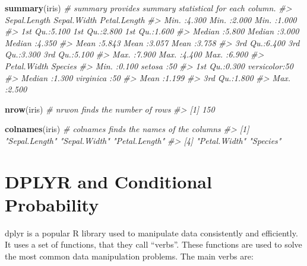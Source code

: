 \documentclass[
]{book}
\newenvironment{Shaded}{\begin{snugshade}}{\end{snugshade}}
\newcommand{\CommentTok}[1]{\textcolor[rgb]{0.56,0.35,0.01}{\textit{#1}}}
\newcommand{\FunctionTok}[1]{\textcolor[rgb]{0.13,0.29,0.53}{\textbf{#1}}}
\newcommand{\NormalTok}[1]{#1}
\theoremstyle{definition}
\theoremstyle{definition}
\theoremstyle{definition}
\theoremstyle{definition}
\theoremstyle{remark}
\begin{document}
\begin{Shaded}
\begin{Highlighting}[]
\FunctionTok{summary}\NormalTok{(iris) }\CommentTok{\# summary provides summary statistical for each column.}
\CommentTok{\#\textgreater{}   Sepal.Length    Sepal.Width     Petal.Length  }
\CommentTok{\#\textgreater{}  Min.   :4.300   Min.   :2.000   Min.   :1.000  }
\CommentTok{\#\textgreater{}  1st Qu.:5.100   1st Qu.:2.800   1st Qu.:1.600  }
\CommentTok{\#\textgreater{}  Median :5.800   Median :3.000   Median :4.350  }
\CommentTok{\#\textgreater{}  Mean   :5.843   Mean   :3.057   Mean   :3.758  }
\CommentTok{\#\textgreater{}  3rd Qu.:6.400   3rd Qu.:3.300   3rd Qu.:5.100  }
\CommentTok{\#\textgreater{}  Max.   :7.900   Max.   :4.400   Max.   :6.900  }
\CommentTok{\#\textgreater{}   Petal.Width          Species  }
\CommentTok{\#\textgreater{}  Min.   :0.100   setosa    :50  }
\CommentTok{\#\textgreater{}  1st Qu.:0.300   versicolor:50  }
\CommentTok{\#\textgreater{}  Median :1.300   virginica :50  }
\CommentTok{\#\textgreater{}  Mean   :1.199                  }
\CommentTok{\#\textgreater{}  3rd Qu.:1.800                  }
\CommentTok{\#\textgreater{}  Max.   :2.500}
\end{Highlighting}
\end{Shaded}

\begin{Shaded}
\begin{Highlighting}[]
\FunctionTok{nrow}\NormalTok{(iris) }\CommentTok{\# nrwon finds the number of rows}
\CommentTok{\#\textgreater{} [1] 150}
\end{Highlighting}
\end{Shaded}

\begin{Shaded}
\begin{Highlighting}[]
\FunctionTok{colnames}\NormalTok{(iris) }\CommentTok{\# colnames finds the names of the columns}
\CommentTok{\#\textgreater{} [1] "Sepal.Length" "Sepal.Width"  "Petal.Length"}
\CommentTok{\#\textgreater{} [4] "Petal.Width"  "Species"}
\end{Highlighting}
\end{Shaded}

\hypertarget{dplyr-and-conditional-probability}{%
\chapter{DPLYR and Conditional Probability}\label{dplyr-and-conditional-probability}}

dplyr is a popular R library used to manipulate data consistently and efficiently. It uses a set of functions, that they call ``verbs''. These functions are used to solve the most common data manipulation problems. The main verbs are:
\end{document}
